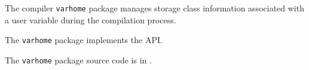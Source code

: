 
The compiler {\tt varhome} package manages storage class information associated 
with a user variable during the compilation process.

The {\tt varhome} package implements the  API.

The {\tt varhome} package source code is in .



